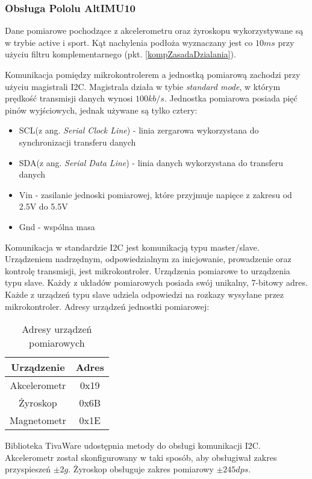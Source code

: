 \subsubsection{Obsługa Pololu AltIMU10}
Dane pomiarowe pochodzące z akcelerometru oraz żyroskopu wykorzystywane są w trybie active i sport. Kąt nachylenia podłoża wyznaczany jest co $10ms$ przy użyciu filtru komplementarnego (pkt. \ref{kompZasadaDzialania}). 
 
Komunikacja pomiędzy mikrokontrolerem a jednostką pomiarową zachodzi przy użyciu magistrali I2C. Magistrala działa w tybie \textit{standard mode}, w którym prędkość transmisji danych wynosi $100kb/s$. Jednostka pomiarowa posiada pięć pinów wyjściowych, jednak używane są tylko cztery:
\begin{itemize}
    \item
    SCL(z ang. {\em Serial Clock Line}) - linia zergarowa wykorzystana do synchronizacji transferu danych
    \item
    SDA(z ang. {\em Serial Data Line}) - linia danych wykorzystana do transferu danych
    \item
    Vin - zasilanie jednoski pomiarowej, które przyjmuje napięce z zakresu od 2.5V do 5.5V
    \item
    Gnd - wspólna masa
\end{itemize} 

Komunikacja w standardzie I2C jest komunikacją typu master/slave. Urządzeniem nadrzędnym, odpowiedzialnym za inicjowanie, prowadzenie oraz kontrolę transmisji, jest mikrokontroler. Urządzenia pomiarowe to urządzenia typu slave. Każdy z układów pomiarowych posiada swój unikalny, 7-bitowy adres. Każde z urządzeń typu slave udziela odpowiedzi na rozkazy wysyłane przez mikrokontroler. Adresy urządzeń jednostki pomiarowej:

\begin{table}[h]
    \caption{Adresy urządzeń pomiarowych}
    \begin{center}
		\label{tab:adresyImu}
		\begin{tabular}{|c|c|}
			\hline
 			Urządzenie & Adres \\
 			\hline
 			Akcelerometr & 0x19 \\  
 			\hline
			Żyroskop & 0x6B \\
			\hline
			Magnetometr & 0x1E \\  
			\hline
		\end{tabular}
	\end{center}
\end{table}

Biblioteka TivaWare udostępnia metody do obsługi komunikacji I2C. Akcelerometr został skonfigurowany w taki sposób, aby obsługiwał zakres przyspieszeń $\pm2g$. Żyroskop obsługuje zakres pomiarowy $\pm245dps$.




